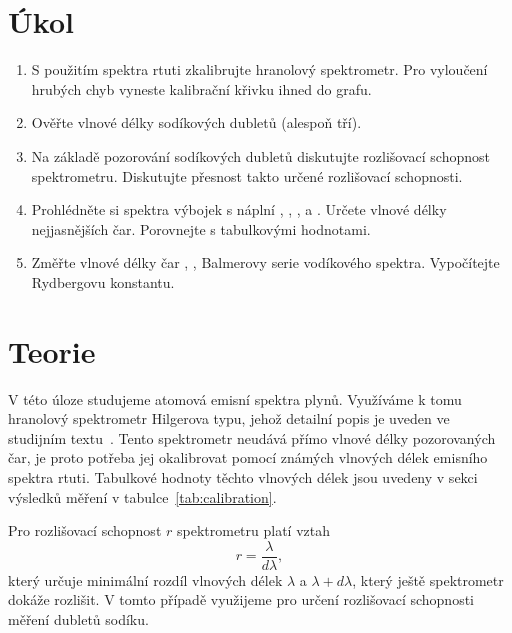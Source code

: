 \documentclass{scirep}
\begin{document}
    \section*{Úkol}

    \begin{enumerate}

        \item S použitím spektra rtuti zkalibrujte hranolový spektrometr.
        Pro vyloučení hrubých chyb vyneste kalibrační křivku ihned do grafu.
        \item Ověřte vlnové délky sodíkových dubletů (alespoň tří).
        \item Na základě pozorování sodíkových dubletů diskutujte rozlišovací schopnost spektrometru.
        Diskutujte přesnost takto určené rozlišovací schopnosti.
        \item Prohlédněte si spektra výbojek s náplní , , ,  a .
        Určete vlnové délky nejjasnějších čar.
        Porovnejte s tabulkovými hodnotami.
        \item Změřte vlnové délky čar , ,  Balmerovy serie vodíkového spektra.
        Vypočítejte Rydbergovu konstantu.

    \end{enumerate}

    \section*{Teorie}

    V této úloze studujeme atomová emisní spektra plynů.
    Využíváme k tomu hranolový spektrometr Hilgerova typu, jehož detailní popis je uveden ve studijním textu~\cite{pokyny}.
    Tento spektrometr neudává přímo vlnové délky pozorovaných čar, je proto potřeba jej okalibrovat pomocí známých vlnových délek emisního spektra rtuti.
    Tabulkové hodnoty těchto vlnových délek jsou uvedeny v sekci výsledků měření v tabulce~\ref{tab:calibration}.

    Pro rozlišovací schopnost $r$ spektrometru platí vztah
    \begin{equation}
        \label{eq:R}
        r = \frac{\lambda}{d\lambda},
    \end{equation}
    který určuje minimální rozdíl vlnových délek $\lambda$ a $\lambda + d\lambda$, který ještě spektrometr dokáže rozlišit.
    V tomto případě využijeme pro určení rozlišovací schopnosti měření dubletů sodíku.
\end{document}
